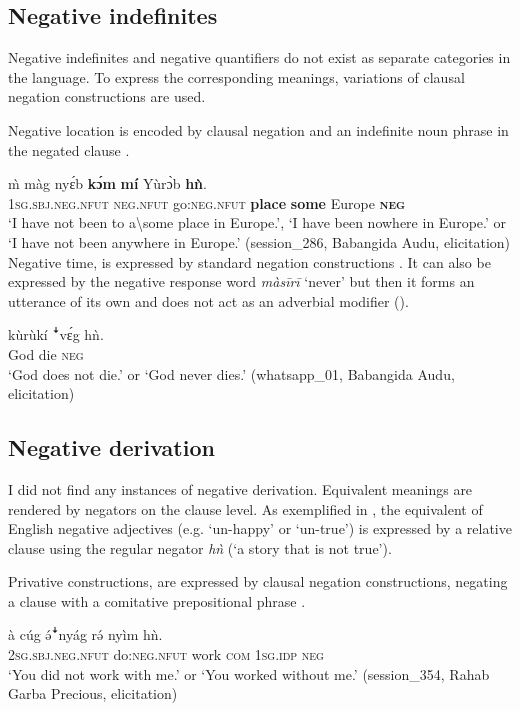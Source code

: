 \documentclass[output=paper,colorlinks,citecolor=brown]{langscibook}
\begin{document}
\subsection{Negative indefinites}\label{sec:kam:3.2}

Negative indefinites and negative quantifiers do not exist as separate categories in the language. 
To express the corresponding meanings, variations of clausal negation constructions are used. 

Negative location is encoded by clausal negation and an indefinite noun phrase in the negated clause .

\ea\label{ex:kam:73} 
    \gll \`{m} màg nyɛ́b \textbf{kɔ́m} \textbf{mí} Yùrɔ̀b \textbf{hǹ}.\\
        \textsc{1sg.sbj.neg.nfut} \textsc{neg}.\textsc{nfut} go:\textsc{neg}.\textsc{nfut} \textbf{place} \textbf{some} Europe \textbf{\textsc{neg}}\\
    \glt ‘I have not been to a{\textbackslash}some place in Europe.’, ‘I have been nowhere in Europe.’ or ‘I have not been anywhere in Europe.’ (session\_286, Babangida Audu, elicitation)
\z 
Negative time, is expressed by standard negation constructions . It can also be expressed by the negative response word \textit{màsīrī} ‘never’ but then it forms an utterance of its own and does not act as an adverbial modifier ().

\ea\label{ex:kam:74} 
    \gll kùrùkí ꜜvɛ́g hǹ.\\
        God die \textsc{neg}\\
    \glt ‘God does not die.’ or ‘God never dies.’ (whatsapp\_01, Babangida Audu, elicitation)
\z 
\subsection{Negative derivation}\label{sec:kam:3.3}

I did not find any instances of negative derivation. Equivalent meanings are rendered by negators on the clause level. As exemplified in , the equivalent of English negative adjectives (e.g. ‘un-happy’ or ‘un-true’) is expressed by a relative clause using the regular negator \textit{hǹ} (‘a story that is not true’).

Privative constructions, are expressed by clausal negation constructions, ne\-gating a clause with a comitative prepositional phrase .

\ea\label{ex:kam:75} 
    \gll à cúg ə́ꜜnyág rə́ nyìm hǹ.\\
        2\textsc{sg.sbj}.\textsc{neg}.\textsc{nfut} do:\textsc{neg}.\textsc{nfut} work \textsc{com} 1\textsc{sg.idp} \textsc{neg}\\
    \glt ‘You did not work with me.’ or ‘You worked without me.’ (session\_354, Rahab Garba Precious, elicitation)
\z 
\end{document}
